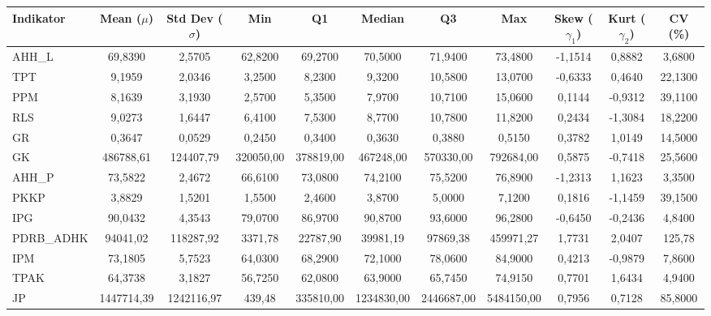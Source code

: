 \begin{adjustbox}{max width=\textwidth}
\small
\begin{tabular}{|>{\centering\arraybackslash}p{2.5cm}|c|c|c|c|c|c|c|c|c|c|}
\hline
\textbf{Indikator} & \textbf{Mean ($\mu$)} & \textbf{Std Dev ($\sigma$)} & \textbf{Min} & \textbf{Q1} & \textbf{Median} & \textbf{Q3} & \textbf{Max} & \textbf{Skew ($\gamma_1$)} & \textbf{Kurt ($\gamma_2$)} & \textbf{CV (\%)} \\
\hline
AHH\_L & 69,8390 & 2,5705 & 62,8200 & 69,2700 & 70,5000 & 71,9400 & 73,4800 & -1,1514 & 0,8882 & 3,6800 \\
TPT & 9,1959 & 2,0346 & 3,2500 & 8,2300 & 9,3200 & 10,5800 & 13,0700 & -0,6333 & 0,4640 & 22,1300 \\
PPM & 8,1639 & 3,1930 & 2,5700 & 5,3500 & 7,9700 & 10,7100 & 15,0600 & 0,1144 & -0,9312 & 39,1100 \\
RLS & 9,0273 & 1,6447 & 6,4100 & 7,5300 & 8,7700 & 10,7800 & 11,8200 & 0,2434 & -1,3084 & 18,2200 \\
GR & 0,3647 & 0,0529 & 0,2450 & 0,3400 & 0,3630 & 0,3880 & 0,5150 & 0,3782 & 1,0149 & 14,5000 \\
GK & 486788,61 & 124407,79 & 320050,00 & 378819,00 & 467248,00 & 570330,00 & 792684,00 & 0,5875 & -0,7418 & 25,5600 \\
AHH\_P & 73,5822 & 2,4672 & 66,6100 & 73,0800 & 74,2100 & 75,5200 & 76,8900 & -1,2313 & 1,1623 & 3,3500 \\
PKKP & 3,8829 & 1,5201 & 1,5500 & 2,4600 & 3,8700 & 5,0000 & 7,1200 & 0,1816 & -1,1459 & 39,1500 \\
IPG & 90,0432 & 4,3543 & 79,0700 & 86,9700 & 90,8700 & 93,6000 & 96,2800 & -0,6450 & -0,2436 & 4,8400 \\
PDRB\_ADHK & 94041,02 & 118287,92 & 3371,78 & 22787,90 & 39981,19 & 97869,38 & 459971,27 & 1,7731 & 2,0407 & 125,78 \\
IPM & 73,1805 & 5,7523 & 64,0300 & 68,2900 & 72,1000 & 78,0600 & 84,9000 & 0,4213 & -0,9879 & 7,8600 \\
TPAK & 64,3738 & 3,1827 & 56,7250 & 62,0800 & 63,9000 & 65,7450 & 74,9150 & 0,7701 & 1,6434 & 4,9400 \\
JP & 1447714,39 & 1242116,97 & 439,48 & 335810,00 & 1234830,00 & 2446687,00 & 5484150,00 & 0,7956 & 0,7128 & 85,8000 \\
\hline
\end{tabular}
\end{adjustbox}
